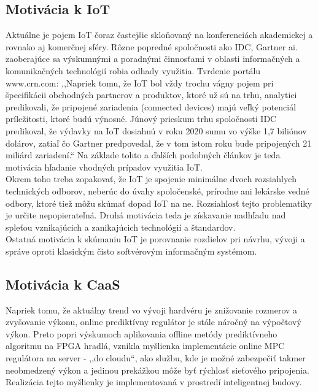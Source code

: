 \subsection*{Motivácia k IoT}
Aktuálne je pojem IoT čoraz častejšie skloňovaný na konferenciách akademickej a rovnako aj komerčnej sféry. Rôzne popredné spoločnosti ako IDC, Gartner ai. zaoberajúce sa výskumnými a poradnými činnosťami v oblasti informačných a komunikačných technológií robia odhady využitia. Tvrdenie portálu www.crn.com:
,,Napriek tomu, že IoT bol vždy trochu vágny pojem pri špecifikácii obchodných partnerov a produktov, ktoré už sú na trhu, analytici predikovali, že pripojené zariadenia (connected devices) majú veľký potenciál príležitosti, ktoré budú výnosné. Júnový prieskum trhu spoločnosti IDC predikoval, že výdavky na IoT dosiahnú v roku 2020 sumu vo výške 1,7 biliónov dolárov, zatiaľ čo Gartner predpovedal, že v tom istom roku bude pripojených 21 miliárd zariadení.``\cite{IOT01} Na základe tohto a ďalších podobných článkov je teda motivácia hľadanie vhodných prípadov využitia IoT.\\
\indent Okrem toho treba zopakovať, že IoT je spojenie minimálne dvoch rozsiahlych technických odborov, neberúc do úvahy spoločenské, prírodne ani lekárske vedné odbory, ktoré tiež môžu skúmať dopad IoT na ne. Rozsiahlosť tejto problematiky je určite nepopierateľná. Druhá motivácia teda je získavanie  nadhľadu nad spleťou vznikajúcich a zanikajúcich technológií a štandardov.\\
\indent Ostatná motivácia k skúmaniu IoT je porovnanie rozdielov pri návrhu, vývoji a správe oproti klasickým čisto softvérovým informačným systémom. 
\subsection*{Motivácia k CaaS}
Napriek tomu, že aktuálny trend vo vývoji hardvéru je znižovanie rozmerov a  zvyšovanie výkonu, online prediktívny regulátor je stále náročný na výpočtový výkon. Preto popri výskumoch aplikovania offline metódy prediktívneho algoritmu na FPGA hradlá, vznikla myšlienka implementácie online MPC regulátora na server - ,,do cloudu``, ako službu, kde je možné zabezpečiť takmer neobmedzený výkon a jedinou prekážkou môže byť rýchlosť sieťového pripojenia. Realizácia tejto myšlienky je implementovaná v prostredí inteligentnej budovy.